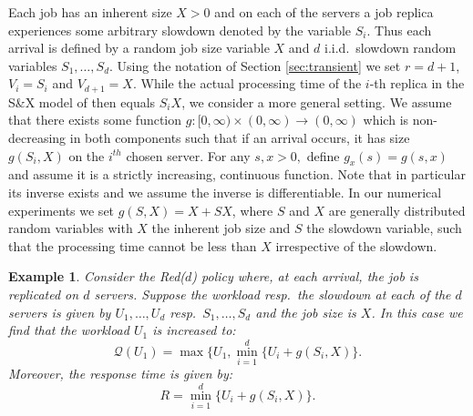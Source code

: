 \documentclass[12pt]{report}
\newcommand{\QQ}{\mathcal{Q}}
\newtheorem{vbd}[theorem]{Example}
\begin{document}
Each job has an inherent size $X>0$ and on each of the servers a job replica experiences some arbitrary slowdown denoted by the variable $S_i$. Thus each arrival is defined by a random job size variable $X$ and $d$ i.i.d.~slowdown random variables $S_1,\dots,S_d$. Using the notation 
of Section \ref{sec:transient} we set $r=d+1$, $V_i=S_i$ and $V_{d+1}=X$. 
While the actual processing time of the $i$-th replica in the S\&X model
of \cite{gardner1} then equals $S_i X$, we consider a more general setting.
We assume that there exists some function $g:[0,\infty) \times (0,\infty) \rightarrow (0,\infty)$ which is non-decreasing in both components such that if an arrival occurs, it has size $g(S_i,X)$ on the $i^{th}$ chosen server. For any $s,x>0,$ define $g_x(s)=g(s,x)$ and assume it is a strictly increasing, continuous function. Note that in particular its inverse exists and we assume the inverse is differentiable.  In our numerical experiments we set $g(S,X)=X+SX$, where $S$ and $X$ are generally distributed random variables with $X$ the inherent job size and $S$ the slowdown variable, such that the processing time cannot be less than $X$ irrespective of the slowdown.
\begin{vbd}
Consider the Red($d$) policy where, at each arrival, the job is replicated on $d$ servers. Suppose the workload resp.~the slowdown at each of the $d$ servers is given by $U_1,\dots, U_d$ resp.~$S_1,\dots,S_d$ and the job size is $X$. In this case we find that the workload $U_1$ is increased to:
$$
\QQ(U_1)=\max\{U_1, \min_{i=1}^d\{U_i + g(S_i,X)\}.
$$
Moreover, the response time is given by:
$$
R=\min_{i=1}^d \{U_i + g(S_i,X)\}.
$$
\end{vbd}
\end{document}
